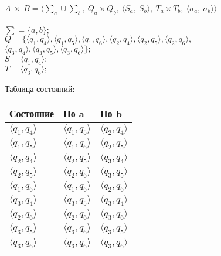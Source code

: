 \documentclass{article}
\begin{document}
\begin{enumerate}
            \(A\ \times\  B = \langle{\sum_a\cup\sum_b,\ Q_a\times Q_b,\ \langle S_a,\ S_b\rangle,\ T_a\times T_b,\ \langle \sigma_a,\ \sigma_b\rangle }\rangle\)\\
            \\
            \hspace*{-20mm}\(\sum = \{ a,b \};\) \\
            \hspace*{-20mm}\(Q = \{\langle q_1,q_4\rangle, \langle q_1,q_5\rangle, \langle q_1,q_6\rangle, \langle q_2,q_4\rangle, \langle q_2,q_5\rangle, \langle q_2,q_6\rangle, \)\\
            \hspace*{55mm}\(\langle q_3,q_4\rangle, \langle q_3,q_5\rangle, \langle q_3,q_6\rangle\};\)\\
            \hspace*{-20mm}\(S = \langle q_1,q_4\rangle;\)\\
            \hspace*{-20mm}\(T = \langle q_3,q_6\rangle;\)\\
            
            \centerline{Таблица состояний:}
            
            \begin{tabular}{ | l | l | l | }
                \hline
                Состояние & По a & По b \\ \hline
                \(\langle q_1, q_4\rangle\) & \(\langle q_1, q_5\rangle\) & \(\langle q_2, q_4\rangle\)  \\ \hline
                \(\langle q_1, q_5\rangle\) & \(\langle q_1, q_6\rangle\) & \(\langle q_2, q_5\rangle\) \\ \hline
                \(\langle q_2, q_4\rangle\) & \(\langle q_2, q_5\rangle\) & \(\langle q_3, q_4\rangle\) \\ \hline
                \(\langle q_2, q_5\rangle\) & \(\langle q_2, q_6\rangle\) & \(\langle q_3, q_5\rangle\) \\ \hline
                \(\langle q_1, q_6\rangle\) & \(\langle q_1, q_6\rangle\) & \(\langle q_2, q_6\rangle\) \\ \hline
                \(\langle q_3, q_4\rangle\) & \(\langle q_3, q_5\rangle\) & \(\langle q_3, q_4\rangle\) \\ \hline 
                \(\langle q_2, q_6\rangle\) & \(\langle q_2, q_6\rangle\) & \(\langle q_3, q_6\rangle\) \\ \hline
                \(\langle q_3, q_5\rangle\) & \(\langle q_3, q_6\rangle\) & \(\langle q_3, q_5\rangle\) \\ \hline
                \(\langle q_3, q_6\rangle\) & \(\langle q_3, q_6\rangle\) & \(\langle q_3, q_6\rangle\) \\
            \hline
            

\end{tabular}
\end{enumerate}
\end{document}
